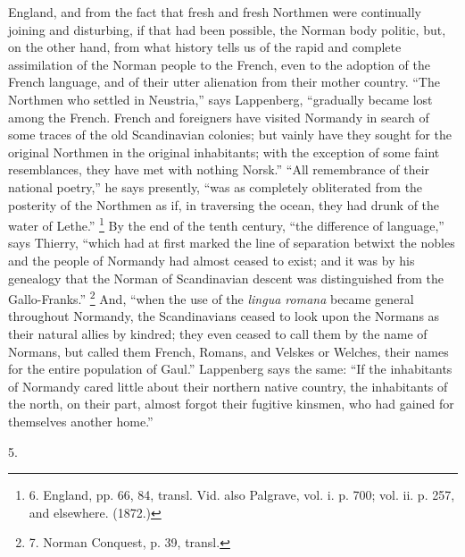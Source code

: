 England, and from the fact that fresh and fresh Northmen were
continually joining and disturbing, if that had been possible, the
Norman body politic, but, on the other hand, from what history tells
us of the rapid and complete assimilation of the Norman people to the
French, even to the adoption of the French language, and of
their utter alienation from their mother country. ``The Northmen who
settled in Neustria,'' says Lappenberg, ``gradually became lost among
the French. French and foreigners have visited Normandy in search of
some traces of the old Scandinavian colonies; but vainly have they
sought for the original Northmen in the original inhabitants; with the
exception of some faint resemblances, they have met with nothing Norsk.''
``All remembrance of their national poetry,'' he says presently, ``was as
completely obliterated from the posterity of the Northmen as if, in
traversing the ocean, they had drunk of the water of Lethe.'' \footnote{6.
England, pp. 66, 84, transl. Vid. also Palgrave, vol. i. p. 700; vol.
ii. p. 257, and elsewhere. (1872.)} By the end of the tenth century, ``the difference of language,''
says Thierry, ``which had at first marked the line of separation
betwixt the nobles and the people of Normandy had almost ceased to
exist; and it was by his genealogy that the Norman of Scandinavian
descent was distinguished from the Gallo-Franks.'' \footnote{7.
Norman Conquest, p. 39, transl.} And, ``when the use of the \emph{lingua romana} became general
throughout Normandy, the Scandinavians ceased to look upon the Normans
as their natural allies by kindred; they even ceased to call them by
the name of Normans, but called them French, Romans, and Velskes or
Welches, their names for the entire population of Gaul.'' Lappenberg
says the same: ``If the inhabitants of Normandy cared little about
their northern native country, the inhabitants of the north, on their
part, almost forgot their fugitive kinsmen, who had gained for
themselves another home.''

5.

